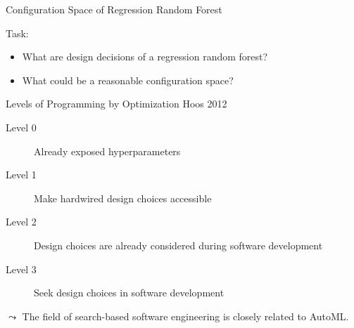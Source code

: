 \begin{frame}{Configuration Space of Regression Random Forest}

Task: \hands
\begin{itemize}
  \item What are design decisions of a regression random forest?
  \item What could be a reasonable configuration space?  
\end{itemize}



\end{frame}
\begin{frame}[c]{Levels of Programming by Optimization {Hoos 2012}}

\begin{description}
\item[Level 0] Already exposed hyperparameters
\pause
\item[Level 1] Make hardwired design choices accessible
\pause
\item[Level 2] Design choices are already considered during software development
\pause 
\item[Level 3] Seek design choices in software development
\end{description}

\pause

$\leadsto$ The field of search-based software engineering is closely related to AutoML.

\end{frame}
